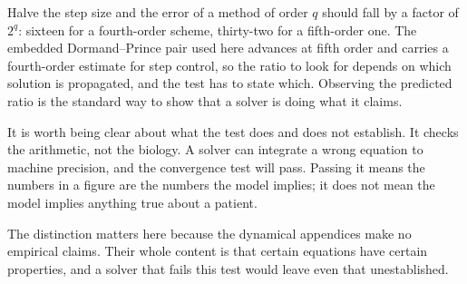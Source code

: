 \begin{reading}
Halve the step size and the error of a method of order $q$ should fall by a
factor of $2^q$: sixteen for a fourth-order scheme, thirty-two for a
fifth-order one. The embedded Dormand--Prince pair used here advances at fifth
order and carries a fourth-order estimate for step control, so the ratio to
look for depends on which solution is propagated, and the test has to state
which. Observing the predicted ratio is the standard way to show that a solver
is doing what it claims.

It is worth being clear about what the test does and does not establish. It
checks the arithmetic, not the biology. A solver can integrate a wrong equation
to machine precision, and the convergence test will pass. Passing it means the
numbers in a figure are the numbers the model implies; it does not mean the
model implies anything true about a patient.

The distinction matters here because the dynamical appendices make no empirical
claims. Their whole content is that certain equations have certain properties,
and a solver that fails this test would leave even that unestablished.
\end{reading}

